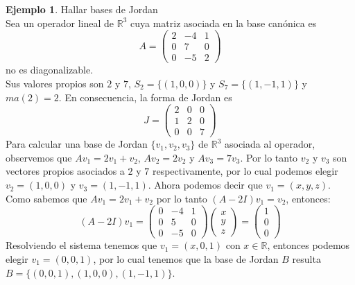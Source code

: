 \documentclass[10pt]{article}
\theoremstyle{definition}
\newtheorem{example}{Ejemplo}[section]
\begin{document}
\begin{example}{Hallar bases de Jordan}
	\\Sea un operador lineal de $\mathbb{R}^3$ cuya matriz asociada en la base canónica es
	$$A=\begin{pmatrix}
			2 & -4 & 1 \\
			0 & 7  & 0 \\
			0 & -5 & 2
		\end{pmatrix}$$
	no es diagonalizable.\\
	Sus valores propios son $2$ y $7$, $S_2=\{(1,0,0)\}$ y $S_7=\{(1,-1,1)\}$ y $ma(2)=2$. En consecuencia, la forma de Jordan es $$J=\begin{pmatrix}
			2 & 0 & 0 \\
			1 & 2 & 0 \\
			0 & 0 & 7
		\end{pmatrix} $$
	Para calcular una base de Jordan $\{v_1,v_2,v_3\}$ de $\mathbb{R}^3$ asociada al operador, observemos que $Av_1=2v_1+v_2$, $Av_2=2v_2$ y $Av_3=7v_3$. Por lo tanto $v_2$ y $v_3$ son vectores propios asociados a $2$ y $7$ respectivamente, por lo cual podemos elegir $v_2=(1,0,0)$ y $v_3=(1,-1,1)$. Ahora podemos decir que $v_1=(x,y,z)$. Como sabemos que $Av_1=2v_1+v_2$ por lo tanto $(A-2I)v_1=v_2$, entonces:
	$$(A-2I)v_1=\begin{pmatrix} 0&-4&1\\0&5&0\\0&-5&0 \end{pmatrix} \begin{pmatrix} x\\y\\z \end{pmatrix} =\begin{pmatrix} 1\\0\\0 \end{pmatrix} $$
	Resolviendo el sistema tenemos que $v_1=(x,0,1)$ con $x\in\mathbb{R}$, entonces podemos elegir $v_1=(0,0,1)$, por lo cual tenemos que la base de Jordan $B$ resulta $B=\{(0,0,1),(1,0,0),(1,-1,1)\}$.
\end{example}\newpage
\end{document}
